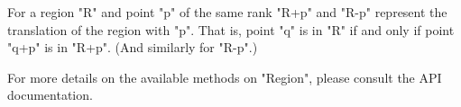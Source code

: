 For a region \xcdmath"R" and point \xcdmath"p" of the same rank 
\xcdmath"R+p" and \xcdmath"R-p" represent the translation of the region
with \xcdmath"p". That is, point \xcdmath"q" is in 
\xcdmath"R" if and only if point \xcdmath"q+p" is in \xcdmath"R+p". (And similarly
for \xcdmath"R-p".)



For more details on the available methods on \xcdmath"Region", please consult the API documentation.
